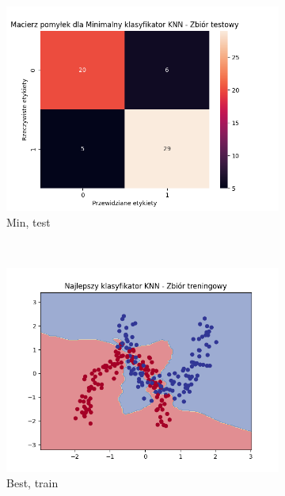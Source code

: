 \documentclass[12pt]{article}
\newcommand*{\subfigwidth}{0.15\textwidth}
\begin{document}
\begin{figure}[H]
\begin{subfigure}[t]{\subfigwidth}
        \includegraphics[width=\linewidth]{img/exp_2/knn/2_3/min/test_matrix.png}
        \caption{Min, test}
    \end{subfigure} 
    \\
    \begin{subfigure}[t]{\subfigwidth}
        \includegraphics[width=\linewidth]{img/exp_2/knn/2_3/best/train_boundary.png}
        \caption{Best, train}
    \end{subfigure}
    \hfill
    \begin{subfigure}[t]{\subfigwidth}

\end{subfigure}
\end{figure}
\end{document}
